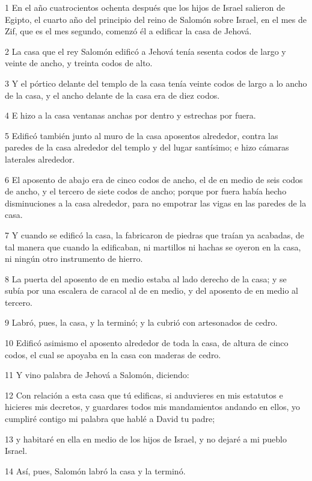 \par 1 En el año cuatrocientos ochenta después que los hijos de Israel salieron de Egipto, el cuarto año del principio del reino de Salomón sobre Israel, en el mes de Zif, que es el mes segundo, comenzó él a edificar la casa de Jehová.
\par 2 La casa que el rey Salomón edificó a Jehová tenía sesenta codos   de largo y veinte de ancho, y treinta codos de alto.
\par 3 Y el pórtico delante del templo de la casa tenía veinte codos   de largo a lo ancho de la casa, y el ancho delante de la casa era de diez codos.
\par 4 E hizo a la casa ventanas anchas por dentro y estrechas por fuera.
\par 5 Edificó también junto al muro de la casa aposentos alrededor, contra las paredes de la casa alrededor del templo y del lugar santísimo; e hizo cámaras laterales alrededor.
\par 6 El aposento de abajo era de cinco codos   de ancho, el de en medio de seis codos de ancho, y el tercero de siete codos de ancho; porque por fuera había hecho disminuciones a la casa alrededor, para no empotrar las vigas en las paredes de la casa.
\par 7 Y cuando se edificó la casa, la fabricaron de piedras que traían ya acabadas, de tal manera que cuando la edificaban, ni martillos ni hachas se oyeron en la casa, ni ningún otro instrumento de hierro.
\par 8 La puerta del aposento de en medio estaba al lado derecho de la casa; y se subía por una escalera de caracol al de en medio, y del aposento de en medio al tercero.
\par 9 Labró, pues, la casa, y la terminó; y la cubrió con artesonados de cedro.
\par 10 Edificó asimismo el aposento alrededor de toda la casa, de altura de cinco codos,  el cual se apoyaba en la casa con maderas de cedro.
\par 11 Y vino palabra de Jehová a Salomón, diciendo:
\par 12 Con relación a esta casa que tú edificas, si anduvieres en mis estatutos e hicieres mis decretos, y guardares todos mis mandamientos andando en ellos, yo cumpliré contigo mi palabra que hablé a David tu padre;
\par 13 y habitaré en ella en medio de los hijos de Israel, y no dejaré a mi pueblo Israel.
\par 14 Así, pues, Salomón labró la casa y la terminó.
